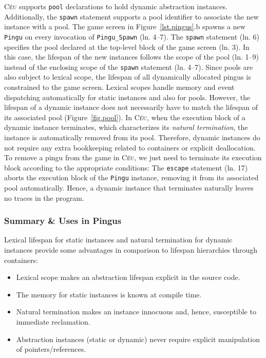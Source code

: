 \documentclass{vgtc}                          %
\newcommand{\CEU}{\textsc{C\'{e}u}\xspace}
\newcommand{\code}[1] {{\small{\texttt{#1}}}}
\begin{document}
\CEU supports \code{pool} declarations to hold dynamic abstraction instances.
Additionally, the \code{spawn} statement supports a pool identifier to
associate the new instance with a pool.
%
The game screen in Figure~\ref{lst.pingus}.b spawns a new \code{Pingu} on every
invocation of \code{Pingu\_Spawn} (ln. 4--7).
%
The \code{spawn} statement (ln. 6) specifies the pool declared at the top-level
block of the game screen (ln. 3).
In this case, the lifespan of the new instances follows the scope of the pool
(ln. 1--9) instead of the enclosing scope of the \code{spawn} statement
(ln. 4--7).
Since pools are also subject to lexical scope, the lifespan of all dynamically
allocated pingus is constrained to the game screen.
%
Lexical scopes handle memory and event dispatching automatically for static
instances and also for pools.
However, the lifespan of a dynamic instance does not necessarily have to match
the lifespan of its associated pool (Figure~\ref{fig.pool}).
In \CEU, when the execution block of a dynamic instance terminates, which
characterizes its \emph{natural termination}, the instance is automatically
removed from its pool.
Therefore, dynamic instances do not require any extra bookkeeping related to 
containers or explicit deallocation.
%
To remove a pingu from the game in \CEU, we just need to terminate its execution
block according to the appropriate conditions:
%
The \code{escape} statement (ln. 17) aborts the execution block of the
\code{Pingu} instance, removing it from its associated pool automatically.
Hence, a dynamic instance that terminates naturally leaves no traces in the 
program.

\subsubsection{Summary \& Uses in Pingus}

Lexical lifespan for static instances and natural termination for dynamic
instances provide some advantages in comparison to lifespan hierarchies through
containers:

\begin{itemize}
\item Lexical scope makes an abstraction lifespan explicit in the source code.
\item The memory for static instances is known at compile time.
\item Natural termination makes an instance innocuous and, hence, susceptible
      to immediate reclamation.
\item Abstraction instances (static or dynamic) never require explicit
      manipulation of pointers/references.
\end{itemize}
\end{document}
